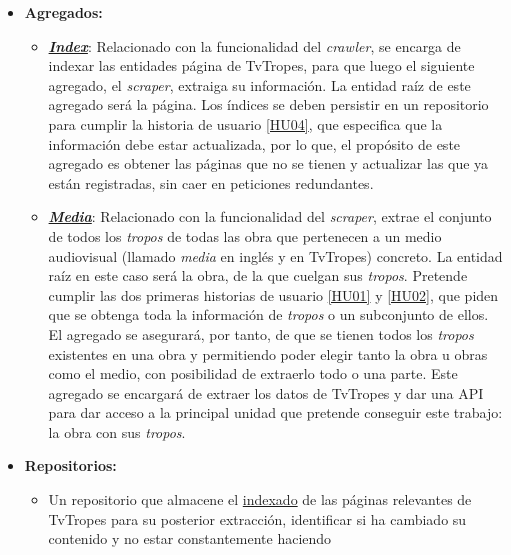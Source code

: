 \begin{itemize}
  \item \textbf{Agregados:}
  \begin{itemize}
    \item
    \textbf{\href{https://github.com/jlgallego99/TropesToGo/blob/master/tropestogo/index/index.go}{\textit{Index}}}:
    Relacionado con la funcionalidad del \textit{crawler}, se encarga de indexar
    las entidades página de TvTropes, para que luego el siguiente agregado, el
    \textit{scraper}, extraiga su información. La entidad raíz de este agregado
    será la página. Los índices se deben persistir en un repositorio para
    cumplir la historia de usuario
    \href{https://github.com/jlgallego99/TropesToGo/issues/9}{[HU04]}, que
    especifica que la información debe estar actualizada, por lo que, el
    propósito de este agregado es obtener las páginas que no se tienen y
    actualizar las que ya están registradas, sin caer en peticiones redundantes.
    \item
    \textbf{\href{https://github.com/jlgallego99/TropesToGo/blob/master/tropestogo/media/media.go}{\textit{Media}}}:
    Relacionado con la funcionalidad del \textit{scraper}, extrae el conjunto de
    todos los \textit{tropos} de todas las obra que pertenecen a un medio
    audiovisual (llamado \textit{media} en inglés y en TvTropes) concreto. La
    entidad raíz en este caso será la obra, de la que cuelgan sus
    \textit{tropos}. Pretende cumplir las dos primeras historias de usuario
    \href{https://github.com/jlgallego99/TropesToGo/issues/6}{[HU01]} y
    \href{https://github.com/jlgallego99/TropesToGo/issues/7}{[HU02]}, que piden
    que se obtenga toda la información de \textit{tropos} o un subconjunto de
    ellos. El agregado se asegurará, por tanto, de que se tienen todos los
    \textit{tropos} existentes en una obra y permitiendo poder elegir tanto la
    obra u obras como el medio, con posibilidad de extraerlo todo o una parte.
    Este agregado se encargará de extraer los datos de TvTropes y dar una API
    para dar acceso a la principal unidad que pretende conseguir este trabajo:
    la obra con sus \textit{tropos}.
  \end{itemize}
  \item \textbf{Repositorios:}
  \begin{itemize}
    \item Un repositorio que almacene el
    \href{https://github.com/jlgallego99/TropesToGo/blob/master/tropestogo/index/repository.go}{indexado}
    de las páginas relevantes de TvTropes para su posterior extracción,
    identificar si ha cambiado su contenido y no estar constantemente haciendo

\end{itemize}
\end{itemize}
